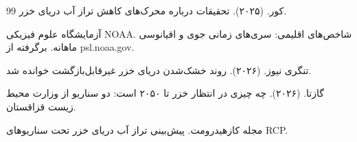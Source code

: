 \documentclass[12pt,a4paper,twocolumn]{article}
\begin{document}
\begin{thebibliography}{99}
کور. (۲۰۲۵). تحقیقات درباره محرک‌های کاهش تراز آب دریای خزر.

آزمایشگاه علوم فیزیکی NOAA. شاخص‌های اقلیمی: سری‌های زمانی جوی و اقیانوسی ماهانه. برگرفته از psl.noaa.gov.

تنگری نیوز. (۲۰۲۶). روند خشک‌شدن دریای خزر غیرقابل‌بازگشت خوانده شد.

گازتا. (۲۰۲۶). چه چیزی در انتظار خزر تا ۲۰۵۰ است: دو سناریو از وزارت محیط زیست قزاقستان.

مجله کازهیدرومت. پیش‌بینی تراز آب دریای خزر تحت سناریوهای RCP.

\end{thebibliography}
\end{document}
